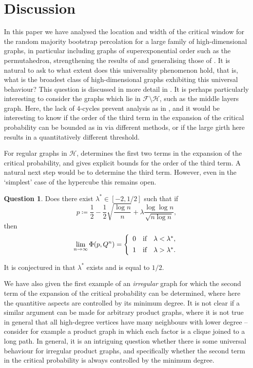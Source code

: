 \documentclass[reqno,a4paper,11pt]{amsart}
\theoremstyle{definition}
\newtheorem{question}[theorem]{Question}
\begin{document}
\section{Discussion}\label{s:discussion}

In this paper we have analysed the location and width of the critical window for the random majority bootstrap percolation for a large family of high-dimensional graphs, in particular including graphs of superexponential order such as the permutahedron, strengthening the results of \cite{CEGK24} and generalising those of \cite{BaBoMo2009}.
It is natural to ask to what extent does this universality phenomenon hold, that is, what is the broadest class of high-dimensional graphs exhibiting this universal behaviour?
This question is discussed in more detail in \cite[Section 9]{CEGK24}.
It is perhaps particularly interesting to consider the graphs which lie in $\mathcal{F} \setminus \mathcal{H}$, such as the middle layers graph.
Here, the lack of $4$-cycles prevent analysis as in , and it would be interesting to know if the order of the third term in the expansion of the critical probability can be bounded as in  via different methods, or if the large girth here results in a quantitatively different threshold.

For regular graphs in $\mathcal{H}$,  determines the first two terms in the expansion of the critical probability, and gives explicit bounds for the order of the third term.
A natural next step would be to determine the third term.
However, even in the `simplest' case of the hypercube this remains open.
\begin{question}
  Does there exist $\lambda^* \in [-2,1/2]$ such that if
  \[
    p \coloneqq \frac{1}{2}-\frac{1}{2} \sqrt{\frac{\log n}{n}} + \lambda \frac{\log \log n}{\sqrt{n \log n}},
  \]
  then
  \[
    \lim_{n \to \infty} \Phi(p, Q^n) = \left\{
      \begin{array} {c@{\quad \textup{if} \quad}l}
        0 & \lambda < \lambda^*,       \\[+1ex]
        1 & \lambda > \lambda^*.
      \end{array}\right.
  \]
\end{question}
It is conjectured in \cite{BaBoMo2009} that $\lambda^*$ exists and is equal to $1/2$.

We have also given the first example of an \emph{irregular} graph for which the second term of the expansion of the critical probability can be determined, where here the quantitive aspects are controlled by its minimum degree.
It is not clear if a similar argument can be made for arbitrary product graphs, where it is not true in general that all high-degree vertices have many neighbours with lower degree -- consider for example a product graph in which each factor is a clique joined to a long path.
In general, it is an intriguing question whether there is some universal behaviour for irregular product graphs, and specifically whether the second term in the critical probability is always controlled by the minimum degree.
\end{document}
